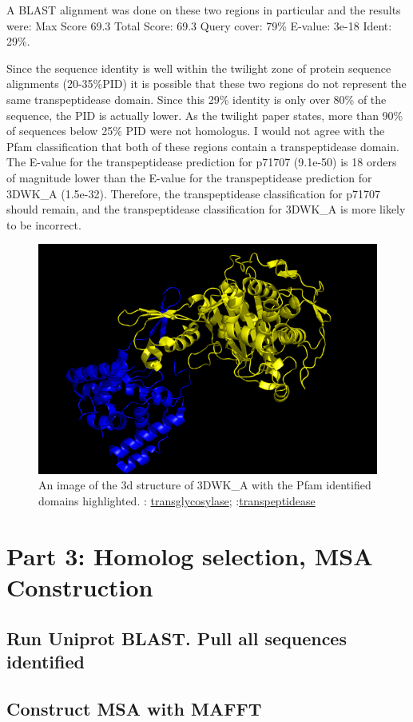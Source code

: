 \documentclass[11pt]{article}
\begin{document}
A BLAST alignment was done on these two regions in particular and the results 
were: Max Score 69.3 Total Score: 69.3 Query cover: 79\% E-value: 3e-18 Ident: 29\%.

Since the sequence identity is well within the twilight zone of protein sequence
alignments (20-35\%PID) 
it is possible that these two regions do not represent the same transpeptidease domain. 
Since this 29\% identity is only over 80\% of the sequence, the PID is actually lower.
As the twilight paper states, more than 90\% of sequences below 25\% PID
were not homologus. I would not agree with the Pfam classification that both of 
these regions contain a transpeptidease domain. The E-value for the transpeptidease 
prediction for p71707 (9.1e-50) is 18 orders of magnitude lower than the E-value for the transpeptidease
prediction for 3DWK\_A (1.5e-32). Therefore, the transpeptidease classification for
p71707 should remain, and the transpeptidease classification for 3DWK\_A is more 
likely to be incorrect.


\begin{figure}[h!]
\centering
\includegraphics[scale=0.5]{3dwk_domains.png}
\caption{An image of the 3d structure of 3DWK\_A with the Pfam identified domains
highlighted. {\color{blue}{Blue}}: \href{http://pfam.sanger.ac.uk/family/PF00912.17}{transglycosylase}; 
{\color{yellow}{Yellow}}:\href{http://pfam.sanger.ac.uk/family/PF00905.17}{transpeptidease}}
\end{figure}

\section*{Part 3: Homolog selection, MSA Construction }

\subsection{Run Uniprot BLAST. Pull all sequences identified}

\subsection{Construct MSA with MAFFT}

\subsection{}
\end{document}
